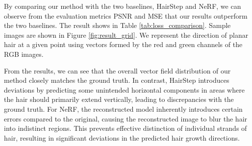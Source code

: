 \documentclass{article}
\begin{document}
By comparing our method with the two baselines, HairStep and NeRF, we can observe from the evaluation metrics PSNR and MSE that our results outperform the two baselines. The result shows in Table \ref{tab:loss_comparison}. Sample images are shown in Figure \ref{fig:result_grid}. We represent the direction of planar hair at a given point using vectors formed by the red and green channels of the RGB images.

From the results, we can see that the overall vector field distribution of our method closely matches the ground truth. In contrast, HairStep introduces deviations by predicting some unintended horizontal components in areas where the hair should primarily extend vertically, leading to discrepancies with the ground truth. For NeRF, the reconstructed model inherently introduces certain errors compared to the original, causing the reconstructed image to blur the hair into indistinct regions. This prevents effective distinction of individual strands of hair, resulting in significant deviations in the predicted hair growth directions.
\end{document}
